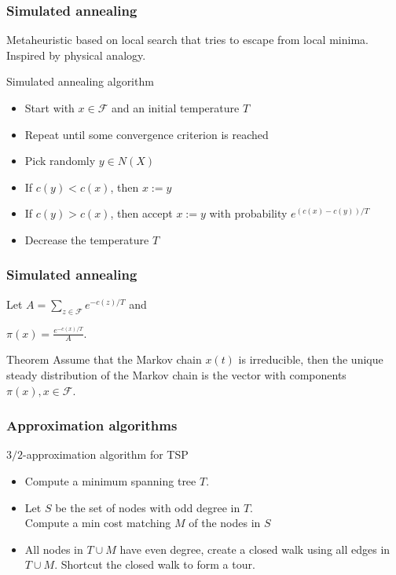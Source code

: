 \documentclass[9pt,handout]{beamer}
\begin{document}
\begin{frame}
\frametitle{Simulated annealing}
Metaheuristic based on  local search that tries to escape from local minima.\\
Inspired by physical analogy.
\begin{block}{Simulated annealing algorithm}
\begin{itemize}
\item<1-> \alert{Start} with $x\in \mathcal F$ and an initial temperature $T$\bigskip

\item<1-> \alert{Repeat} until some convergence criterion is reached\bigskip

\item<1-> \alert{Pick} randomly $y\in N(X)$\bigskip

\item<1-> \alert{If} $c(y)<c(x)$, \alert{then} $x:=y$\bigskip

\item<1-> \alert{If} $c(y)> c(x)$, \alert{then accept} $x:=y$ with 
probability $e^{(c(x)-c(y))/T}$\bigskip

\item<1-> \alert{Decrease} the temperature $T$
\end{itemize}
\end{block}
\end{frame}
\begin{frame}
\frametitle{Simulated annealing}
Let $A= \sum_{z\in \mathcal F} e^{-c(z)/T}$ and \bigskip

$\pi(x) = \frac{e^{-c(x)/T}}{A}.$\bigskip

\begin{block}{Theorem}
Assume that the Markov chain $x(t)$ is irreducible, then the unique steady
distribution of the Markov chain is the vector with components
$\pi(x), x\in \mathcal F$.
\end{block}
\end{frame}
\begin{frame}
\frametitle{Approximation algorithms}
\begin{block}{$3/2$-approximation algorithm for TSP}
\begin{itemize}
\item<1-> Compute a \alert{minimum spanning tree} $T$.\bigskip

\item<1-> Let $S$ be the set of nodes with \alert{odd degree} in $T$.\\
Compute a min cost matching $M$ of the nodes in $S$
\bigskip
\item<1-> All nodes in $T\cup M$ have even degree, create a closed walk using all 
edges in $T\cup M$. Shortcut the closed walk to form a tour.
\end{itemize}
\end{block}
\end{frame}
\end{document}

